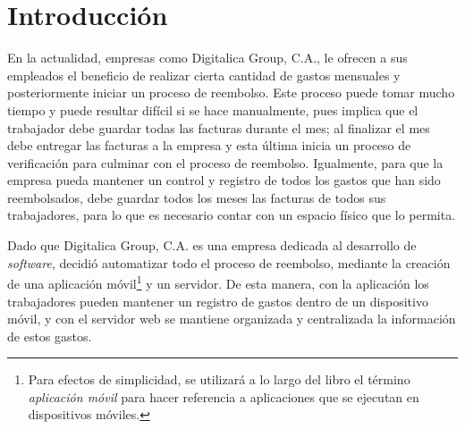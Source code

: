 \chapter*{Introducción} \label{sec:Introduccion}

\vspace{5 mm}
En la actualidad, empresas como Digitalica Group, C.A., le ofrecen a sus empleados el beneficio de realizar cierta cantidad de gastos mensuales y posteriormente iniciar un proceso de reembolso. Este proceso puede tomar mucho tiempo y puede resultar difícil si se hace manualmente, pues implica que el trabajador debe guardar todas las facturas durante el mes; al finalizar el mes debe entregar las facturas a la empresa y esta última inicia un proceso de verificación para culminar con el proceso de reembolso. Igualmente, para que la empresa pueda mantener un control y registro de todos los gastos que han sido reembolsados, debe guardar todos los meses las facturas de todos sus trabajadores, para lo que es necesario contar con un espacio físico que lo permita. 

Dado que Digitalica Group, C.A. es una empresa dedicada al desarrollo de \textit{software}, decidió automatizar todo el proceso de reembolso, mediante la creación de una aplicación móvil\footnote{Para efectos de simplicidad, se utilizará a lo largo del libro el término \textit{aplicación móvil} para hacer referencia a aplicaciones que se ejecutan en dispositivos móviles.} y un servidor. De esta manera, con la aplicación los trabajadores pueden mantener un registro de gastos dentro de un dispositivo móvil, y con el servidor web se mantiene organizada y centralizada la información de estos gastos.




